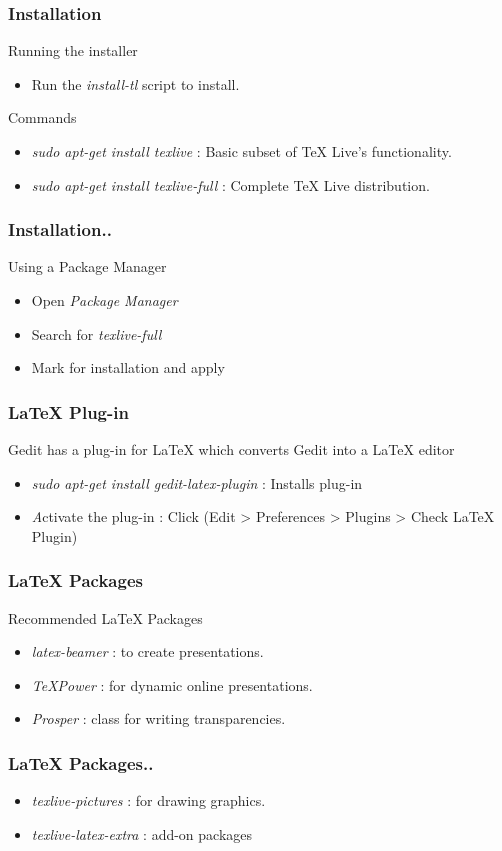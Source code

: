 \documentclass[17pt,compress]{beamer}
\begin{document}
\begin{frame}[fragile]
  \frametitle{Installation}
  Running the installer
  \begin{itemize}
  \item Run the \emph{install-tl} script to install.
  \end{itemize}
  Commands
  \begin{itemize}
  \item \emph{sudo apt-get install texlive} : Basic subset of TeX Live's functionality.
  \item \emph{sudo apt-get install texlive-full} : Complete TeX Live distribution.
  \end{itemize}
\end{frame}

\begin{frame}[fragile]
  \frametitle{Installation..}
  Using a Package Manager
  \begin{itemize}
  \item Open \emph{Package Manager}
  \item Search for \emph{texlive-full}
  \item Mark for installation and apply
  \end{itemize}
\end{frame}

\begin{frame}[fragile]
  \frametitle{LaTeX Plug-in}
  Gedit has a plug-in for LaTeX which converts Gedit into a LaTeX editor
  \begin{itemize}
  \item \emph{sudo apt-get install gedit-latex-plugin} : Installs plug-in
  \item \emph Activate the plug-in : Click (Edit > Preferences > Plugins > Check LaTeX Plugin)
  \end{itemize}
\end{frame}

\begin{frame}[fragile]
  \frametitle{LaTeX Packages}
  Recommended LaTeX Packages
  \begin{itemize}
  \item \emph{latex-beamer} : to create presentations.
  \item \emph{TeXPower} : for dynamic online presentations.
  \item \emph{Prosper} : class for writing transparencies.
  \end{itemize}
\end{frame}

\begin{frame}[fragile]
  \frametitle{LaTeX Packages..}
  \begin{itemize}
  \item \emph{texlive-pictures} : for drawing graphics.
  \item \emph{texlive-latex-extra} : add-on packages
  \end{itemize}
\end{frame}
\end{document}
